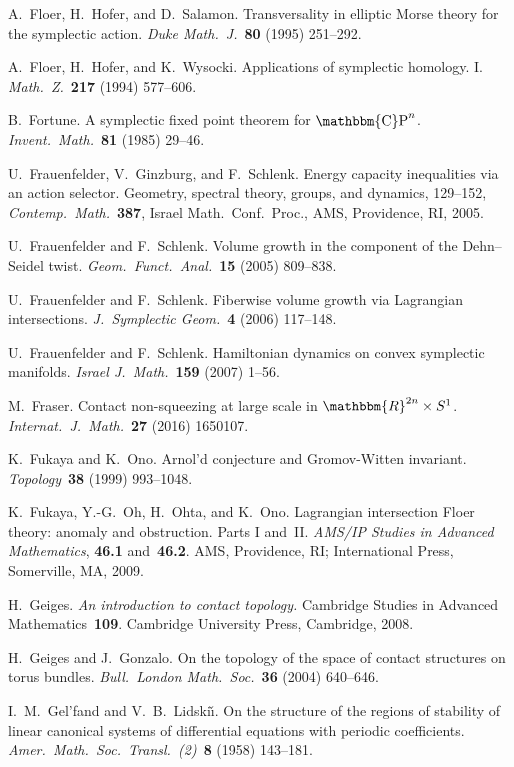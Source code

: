 \documentclass[12pt,twoside]{amsart}
\theoremstyle{plain}
\numberwithin{figure}{section}
\numberwithin{equation}{section}
\def\RR{\mathbbm{R}}
\def\CP{\operatorname{\mathbbm{C}P}}
\begin{document}
\begin{thebibliography}{999}
A.\ Floer, H.\ Hofer, and D.\ Salamon.
Transversality in elliptic Morse theory for the symplectic action.
{\it Duke Math.~J.}~{\bf 80} (1995) 251--292. 

A.\ Floer, H.\ Hofer, and K.\ Wysocki. 
Applications of symplectic homology. I. 
{\it Math.\ Z.}~{\bf 217} (1994) 577--606.

B.\ Fortune.
A symplectic fixed point theorem for $\CP^n$. 
{\it Invent.\ Math.}~{\bf 81} (1985) 29--46. 

U.\ Frauenfelder, V.\ Ginzburg, and F.\ Schlenk.
Energy capacity inequalities via an action selector. 
Geometry, spectral theory, groups, and dynamics, 129--152,
{\it Contemp.\ Math.}~{\bf 387}, Israel Math.\ Conf.\ Proc., AMS, Providence, RI, 2005. 

U.\ Frauenfelder and F.\ Schlenk.
Volume growth in the component of the Dehn--Seidel twist.
{\it Geom.\ Funct.\ Anal.}~{\bf 15} (2005) 809--838.

U.\ Frauenfelder and F.\ Schlenk.
Fiberwise volume growth via Lagrangian intersections.
{\it J.~Symplectic Geom.}~{\bf 4} (2006) 117--148.

U.\ Frauenfelder and F.\ Schlenk.
Hamiltonian dynamics on convex symplectic manifolds. 
{\it Israel J.\ Math.}~{\bf 159} (2007) 1--56. 

M.\ Fraser.
Contact non-squeezing at large scale in $\RR^{2n} \times S^1$. 
{\it Internat.\ J.\ Math.}~{\bf 27} (2016) 1650107.


K.\ Fukaya and K.\ Ono.
Arnol'd conjecture and Gromov-Witten invariant.
{\it Topology}~{\bf 38} (1999) 993--1048.

K.\ Fukaya, Y.\--G.\ Oh, H.\ Ohta, and K.\ Ono.
Lagrangian intersection Floer theory: anomaly and obstruction. Parts I and~II. 
{\it AMS/IP Studies in Advanced Mathematics}, {\bf 46.1} and~{\bf 46.2}. 
AMS, Providence, RI; International Press, Somerville, MA, 2009. 

H.\ Geiges.
{\it An introduction to contact topology.}
Cambridge Studies in Advanced Mathematics~{\bf 109}. 
Cambridge University Press, Cambridge, 2008. 

H.\ Geiges and J.\ Gonzalo.
On the topology of the space of contact structures on torus bundles. 
{\it Bull.\ London Math.\ Soc.}~{\bf 36} (2004) 640--646.

I.\ M.\ Gel'fand and V.\ B.\ Lidski\v{\i}.
On the structure of the regions of stability of linear canonical systems of differential equations with periodic coefficients.
{\it Amer.\ Math.\ Soc.\ Transl.\ (2)}~{\bf 8} (1958) 143--181.



\end{thebibliography}
\end{document}
